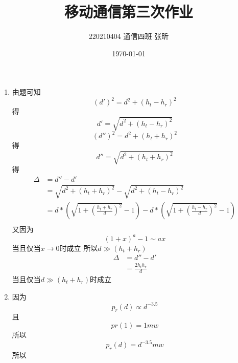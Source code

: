\documentclass{article}
\title{移动通信第三次作业}
\author{220210404 通信四班 张昕}
\date{\today}
\begin{document}
\maketitle
{}

\begin{enumerate}
    \item 由题可知
          \begin{equation}
            (d')^2=d^2+(h_t-h_r)^2
          \end{equation}
          得
          \begin{equation}
            d'=\sqrt{d^2+(h_t-h_r)^2}
          \end{equation}
          \begin{equation}
            (d'')^2=d^2+(h_t+h_r)^2
          \end{equation}
          得
          \begin{equation}
            d''=\sqrt{d^2+(h_t+h_r)^2}
          \end{equation}
          得
          \begin{align}
            \Delta &=d''-d'\\
                   &=\sqrt{d^2+(h_t+h_r)^2}-\sqrt{d^2+(h_t-h_r)^2}\\
                   &=d*(\sqrt{1+(\frac{h_t+h_r}{d})^2}-1)-d*(\sqrt{1+(\frac{h_t-h_r}{d})^2}-1)\\
          \end{align}
          又因为
          \begin{equation}
            (1+x)^a-1 \sim ax 
          \end{equation}
          当且仅当$x \to 0$时成立
          所以$d \gg (h_t+h_r)$
          \begin{align}
            \Delta &=d''-d'\\
                   &=\frac{2h_th_r}{d}
          \end{align}
          当且仅当$d \gg (h_t+h_r)$时成立
    \item 因为
          \begin{equation}
            p_r(d) \propto d^{-3.5}
          \end{equation}
          且
          \begin{equation}
            pr(1)=1mw
          \end{equation}
          所以
          \begin{equation}
            p_r(d) = d^{-3.5}mw
          \end{equation}
          所以

\end{enumerate}
\end{document}
